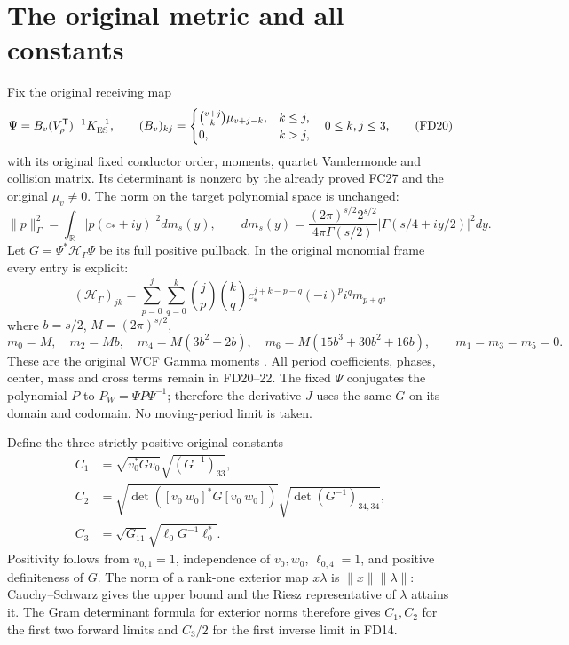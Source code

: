 \documentclass[11pt]{article}
\newcommand{\R}{\mathbb R}
\begin{document}
\section{The original metric and all constants}
Fix the original receiving map
\[
 \Psi=B_v(V_\rho^{\mathsf T})^{-1}K_{\rm ES}^{-1},\qquad
 (B_v)_{kj}=\begin{cases}
 \binom{v+j}{k}\mu_{v+j-k},&k\le j,\\0,&k>j,
 \end{cases}\quad 0\le k,j\le3,
 \tag{FD20}
\]
with its original fixed conductor order, moments,
quartet Vandermonde and collision matrix. Its determinant
is nonzero by the already proved FC27 and the original
\(\mu_v\ne0\). The norm on the target polynomial space
is unchanged:
\[
 \|p\|_\Gamma^2=\int_\R|p(c_*+iy)|^2dm_s(y),\qquad
 dm_s(y)=\frac{(2\pi)^{s/2}2^{s/2}}{4\pi\Gamma(s/2)}
                |\Gamma(s/4+iy/2)|^2dy .
 \tag{FD21}
\]
Let \(G=\Psi^*\mathcal H_\Gamma\Psi\) be its full positive
pullback. In the original monomial frame every entry is
explicit:
\[
 (\mathcal H_\Gamma)_{jk}
 =\sum_{p=0}^j\sum_{q=0}^k
 \binom jp\binom kq c_*^{j+k-p-q}(-i)^pi^q m_{p+q},
 \tag{FD22}
\]
where \(b=s/2\), \(M=(2\pi)^{s/2}\),
\[
 m_0=M,\quad m_2=Mb,\quad m_4=M(3b^2+2b),\quad
 m_6=M(15b^3+30b^2+16b),\qquad m_1=m_3=m_5=0.
\]
These are the original WCF Gamma moments \cite{WCF}.
All period coefficients, phases, center, mass and cross
terms remain in FD20--22. The fixed \(\Psi\) conjugates
the polynomial \(P\) to \(P_W=\Psi P\Psi^{-1}\); therefore
the derivative \(J\) uses the same \(G\) on its domain
and codomain. No moving-period limit is taken.

Define the three strictly positive original constants
\[
\begin{aligned}
 C_1&=\sqrt{v_0^*Gv_0}\sqrt{(G^{-1})_{33}},\\
 C_2&=\sqrt{\det([v_0\ w_0]^*G[v_0\ w_0])}
                       \sqrt{\det(G^{-1})_{34,34}},\\
 C_3&=\sqrt{G_{11}}\sqrt{\ell_0G^{-1}\ell_0^*}.
\end{aligned}\tag{FD23}
\]
Positivity follows from \(v_{0,1}=1\), independence
of \(v_0,w_0\), \(\ell_{0,4}=1\), and positive definiteness
of \(G\). The norm of a rank-one exterior map
\(x\lambda\) is \(\|x\|\|\lambda\|\): Cauchy--Schwarz
gives the upper bound and the Riesz representative of
\(\lambda\) attains it. The Gram determinant formula
for exterior norms therefore gives \(C_1,C_2\) for the
first two forward limits and \(C_3/2\) for the first
inverse limit in FD14.
\end{document}
